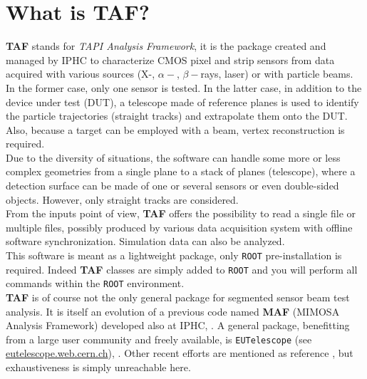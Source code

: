 \documentclass[a4paper, 12pt, twoside]{article}
\newcommand{\TAF}{{\bf TAF }}
\newcommand{\MAF}{{\bf MAF }}
\begin{document}
\newpage 

\section{What is TAF?}

\TAF stands for {\it TAPI Analysis Framework}, it is the package created and managed by IPHC to characterize CMOS pixel and strip sensors from data acquired with various sources (X-, $\alpha-$, $\beta-$rays, laser) or with particle beams. In the former case, only one sensor is tested. In the latter case, in addition to the device under test (DUT), a telescope made of reference planes is used to identify the particle trajectories (straight tracks) and extrapolate them onto the DUT. Also, because a target can be employed with a beam, vertex reconstruction is required.\\
Due to the diversity of situations, the software can handle some more or less complex geometries from a single plane to a stack of planes (telescope), where a detection surface can be made of one or several sensors or even double-sided objects. However, only straight tracks are considered.\\
From the inputs point of view, \TAF offers the possibility to read a single file or multiple files, possibly produced by various data acquisition system with offline software synchronization. Simulation data can also be analyzed.\\

\noindent
This software is meant as a lightweight package, only {\tt ROOT} pre-installation is required. Indeed \TAF classes are simply added to {\tt ROOT} and you will perform all commands within the {\tt ROOT} environment.\\
\TAF is of course not the only general package for segmented sensor beam test analysis. It is itself an evolution of a previous code named \MAF (MIMOSA Analysis Framework) developed also at IPHC, \cite{noteMAF}. A general package, benefitting from a large user community and freely available, is {\tt EUTelescope} (see \href{http://eutelescope.web.cern.ch/}{eutelescope.web.cern.ch}), \cite{EUtelescope}. Other recent efforts are mentioned as reference \cite{FIRST, GLOBAL, JUDITH}, but exhaustiveness is simply unreachable here.\\

\vspace{0.8cm}
\end{document}
